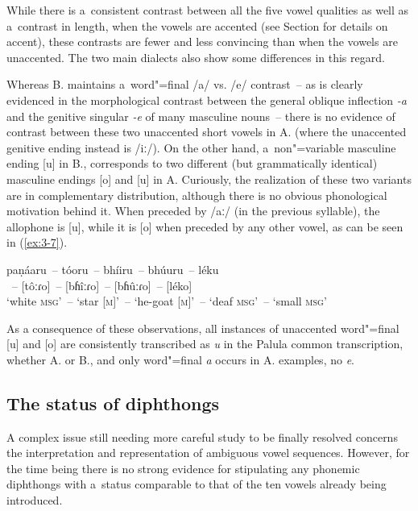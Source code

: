 While there is a~consistent contrast between all the five vowel qualities as well as a~contrast in length, when the vowels are accented (see Section  for details on accent), these contrasts are fewer and less convincing than when the vowels are unaccented. The two main dialects also show some differences in this regard. 


Whereas B. maintains a~word"=final /a/ vs. /e/ contrast~-- as is clearly evidenced in the morphological contrast between the general oblique inflection \textit{-a} and the genitive singular \textit{-e} of many masculine nouns~-- there is no evidence of contrast between these two unaccented short vowels in A. (where the unaccented genitive ending instead is /iː/). On the other hand, a~non"=variable masculine ending [u] in B., corresponds to two different (but grammatically identical) masculine endings [o] and [u] in A. Curiously, the realization of these two variants are in complementary distribution, although there is no obvious phonological motivation behind it. When preceded by /aː/ (in the previous syllable), the allophone is [u], while it is [o] when preceded by any other vowel, as can be seen in (\ref{ex:3-7}).

\begin{exe}
\ex
\label{ex:3-7}
\gll paṇáaru~-- tóoru~-- bhíiru~-- bhúuru~--  léku \\
[paɳâːɾu]~-- [tôːɾo]~-- [bɦîːɾo]~-- [bɦûːɾo]~-- [léko] \\ 
\glt `white \textsc{msg}'~-- `star [\textsc{m}]'~-- `he-goat [\textsc{m}]'~-- `deaf \textsc{msg}'~-- `small \textsc{msg}'
\end{exe}

As a consequence of these observations, all instances of unaccented word"=final [u] and [o] are consistently transcribed as \textit{u} in the Palula common transcription, whether A. or B., and only word"=final \textit{a} occurs in A. examples, no \textit{e}.


\subsection{The status of diphthongs}
\label{subsec:3-2-3}

A complex issue still needing more careful study to be finally resolved concerns the interpretation and representation of ambiguous vowel sequences. However, for the time being there is no strong evidence for stipulating any phonemic diphthongs with a~status comparable to that of the ten vowels already being introduced.

